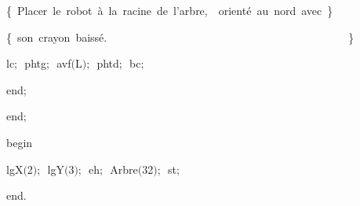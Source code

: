 {\vspace{\neglskip}\mbox{\blc  \blk\blk\blk\blk\idt  \cmt  \{\ Placer\ le\ robot\ à\ la\ racine\ de\ l{'}arbre,\ \ orienté\ au\ nord\ avec\ \}\idt }\par 
\vspace{\neglskip}\mbox{\blc  \blk\blk\blk\blk\idt  \cmt  \{\ son\ crayon\ baissé.\ \ \ \ \ \ \ \ \ \ \ \ \ \ \ \ \ \ \ \ \ \ \ \ \ \ \ \ \ \ \ \ \ \ \ \ \ \ \ \ \ \ \ \ \}\idt }\par 
\vspace{\neglskip}\mbox{\blc  \blk\blk\blk\blk\idt  lc$;$\ phtg$;$\ avf$($L$)$$;$\ phtd$;$\ bc$;$\ }\par 
\vspace{\neglskip}\mbox{\blc  \blk\blk\blk\idt  \mcl end\idt $;$}\par 
\vspace{\neglskip}\mbox{\blc  \blk\idt  \mcl end\idt $;$}\par 
\medskip

\vspace{\neglskip}\mbox{\blc  \idt  \mcl begin\idt }\par 
\vspace{\neglskip}\mbox{\blc  \blk\idt  lgX$($2$)$$;$\ lgY$($3$)$$;$\ eh$;$\ Arbre$($32$)$$;$\ st$;$}\par 
\vspace{\neglskip}\mbox{\blc  \idt  \mcl end\idt $.$}\par 

\medskip }

